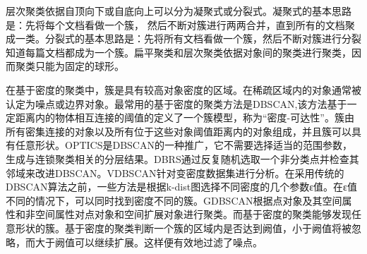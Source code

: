 层次聚类依据自顶向下或自底向上可以分为凝聚式或分裂式。凝聚式的基本思路是：先将每个文档看做一个簇， 然后不断对簇进行两两合并，直到所有的文档聚成一类。分裂式的基本思路是：先将所有文档看做一个簇，然后不断对簇进行分裂知道每篇文档都成为一个簇。扁平聚类和层次聚类依据对象间的聚类进行聚类，因而聚类只能为固定的球形。

在基于密度的聚类中，簇是具有较高对象密度的区域。在稀疏区域内的对象通常被认定为噪点或边界对象。最常用的基于密度的聚类方法是DBSCAN,该方法基于一定距离内的物体相互连接的阈值的定义了一个簇模型，称为“密度-可达性”。簇由所有密集连接的对象以及所有位于这些对象阈值距离内的对象组成，并且簇可以具有任意形状。OPTICS是DBSCAN的一种推广，它不需要选择适当的范围参数，生成与连锁聚类相关的分层结果。DBRS通过反复随机选取一个非分类点并检查其邻域来改进DBSCAN。VDBSCAN针对变密度数据集进行分析。在采用传统的DBSCAN算法之前，一些方法是根据k-dist图选择不同密度的几个参数ε值。在ε值不同的情况下，可以同时找到密度不同的簇。GDBSCAN根据点对象及其空间属性和非空间属性对点对象和空间扩展对象进行聚类。而基于密度的聚类能够发现任意形状的簇。基于密度的聚类判断一个簇的区域内是否达到阙值，小于阙值将被忽略，而大于阙值可以继续扩展。这样便有效地过滤了噪点。
